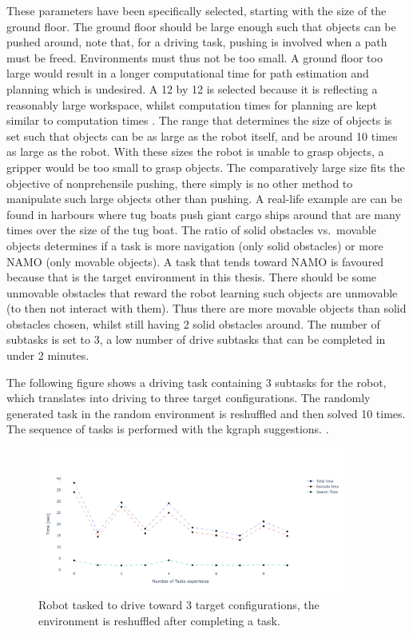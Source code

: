 These parameters have been specifically selected, starting with the size of the ground floor. The ground floor should be large enough such that objects can be pushed around, note that, for a driving task, pushing is involved when a path must be freed. Environments must thus not be too small. A ground floor too large would result in a longer computational time for path estimation and planning which is undesired. A 12 by 12 is selected because it is reflecting a reasonably large workspace, whilst computation times for planning are kept similar to computation times . The range that determines the size of objects is set such that objects can be as large as the robot itself, and be around 10 times as large as the robot. With these sizes the robot is unable to grasp objects, a gripper would be too small to grasp objects. The comparatively large size fits the objective of nonprehensile pushing, there simply is no other method to manipulate such large objects other than pushing. A real-life example are can be found in harbours where tug boats push giant cargo ships around that are many times over the size of the tug boat. The ratio of solid obstacles vs.~movable objects determines if a task is more navigation (only solid obstacles) or more \ac{NAMO} (only movable objects). A task that tends toward \ac{NAMO} is favoured because that is the target environment in this thesis. There should be some unmovable obstacles that reward the robot learning such objects are unmovable (to then not interact with them). Thus there are more movable objects than solid obstacles chosen, whilst still having 2 solid obstacles around. The number of subtasks is set to 3, a low number of drive subtasks that can be completed in under 2 minutes.\bs

The following figure shows a driving task containing 3 subtasks for the robot, which translates into driving to three target configurations. The randomly generated task in the random environment is reshuffled and then solved 10 times. The sequence of tasks is performed with the \ac{kgraph} suggestions. .\bs 

\begin{figure}[H]
    \centering
    \includegraphics[width=0.9\textwidth]{figures/results/random_drive_execution_times}
    \caption{Robot tasked to drive toward 3 target configurations, the environment is reshuffled after completing a task.}%
    \label{fig:rand_drive_times}
\end{figure}

